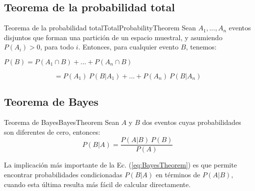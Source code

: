\subsection{Teorema de la probabilidad total}
\begin{theorem}{Teorema de la probabilidad total}{TotalProbabilityTheorem}
Sean $A_1, ..., A_n$ eventos disjuntos que forman una partición de un espacio
muestral, y asumiendo $P(A_i)>0$, para todo $i$. Entonces,
para cualquier evento $B$, tenemos:

\begin{center}
    $P(B) = P(A_1 \cap B) + ... + P(A_n \cap B)$
\end{center}

\begin{equation}
    =P(A_1)\ P(B|A_1) + ... + P(A_n) \ P(B|A_n)
\end{equation}

\end{theorem}


\subsection{Teorema de Bayes}

\begin{theorem}{Teorema de Bayes}{BayesTheorem}
Sean $A$ y $B$ dos eventos cuyas probabilidades son diferentes de cero,
entonces:
    \begin{equation}
        P(B|A) = \frac{P(A|B) \ P(B)}{P(A)}
        \label{eq:BayesTheorem}
    \end{equation}

La implicación más importante de la Ec. (\ref{eq:BayesTheorem}) es que permite
encontrar probabilidades condicionadas $P(B|A)$ en términos de $P(A|B)$, cuando
esta última resulta más fácil de calcular directamente.
\end{theorem}
